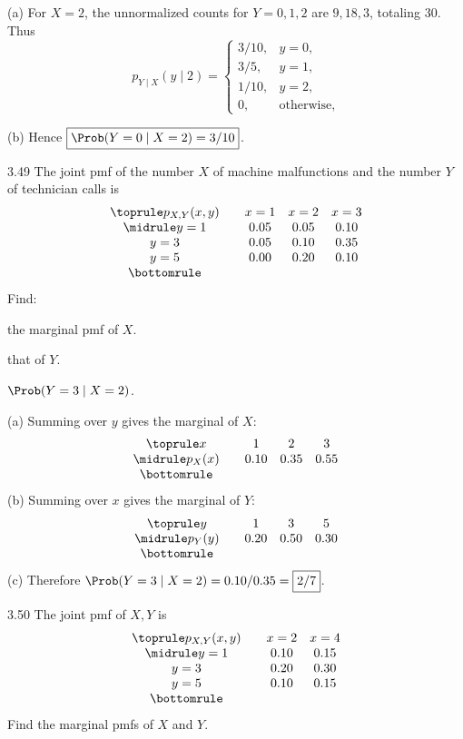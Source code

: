 \documentclass[11pt,oneside]{article}
\begin{document}
\begin{solution}
\noindent\textup{(a)} For $X=2$, the unnormalized counts for $Y=0,1,2$ are $9,18,3$, totaling $30$. Thus
\[
\boxed{p_{Y\mid X}(y\mid2)=\begin{cases}3/10,&y=0,\\3/5,&y=1,\\1/10,&y=2,\\0,&\text{otherwise},\end{cases}}
\]
\par\medskip
\noindent\textup{(b)} Hence $\boxed{\Prob(Y=0\mid X=2)=3/10}$.
\end{solution}

\begin{exercise}{3.49}
The joint pmf of the number $X$ of machine malfunctions and the number $Y$ of technician calls is
\[
\begin{array}{c@{\qquad}ccc}\toprule
p_{X,Y}(x,y)&x=1&x=2&x=3\\\midrule
y=1&0.05&0.05&0.10\\
y=3&0.05&0.10&0.35\\
y=5&0.00&0.20&0.10\\\bottomrule
\end{array}
\]
Find:
\begin{exercisesubparts}
\item the marginal pmf of $X$.
\item that of $Y$.
\item $\Prob(Y=3\mid X=2)$.
\end{exercisesubparts}
\end{exercise}

\begin{solution}
\noindent\textup{(a)} Summing over $y$ gives the marginal of $X$:
\[
\begin{array}{c@{\qquad}ccc}\toprule
x&1&2&3\\\midrule p_X(x)&0.10&0.35&0.55\\\bottomrule
\end{array}
\]
\noindent\textup{(b)} Summing over $x$ gives the marginal of $Y$:
\[
\begin{array}{c@{\qquad}ccc}\toprule
y&1&3&5\\\midrule p_Y(y)&0.20&0.50&0.30\\\bottomrule
\end{array}
\]
\noindent\textup{(c)} Therefore $\Prob(Y=3\mid X=2)=0.10/0.35=\boxed{2/7}$.
\end{solution}

\begin{exercise}{3.50}
The joint pmf of $X,Y$ is
\[
\begin{array}{c@{\qquad}cc}\toprule
p_{X,Y}(x,y)&x=2&x=4\\\midrule
y=1&0.10&0.15\\
y=3&0.20&0.30\\
y=5&0.10&0.15\\\bottomrule
\end{array}
\]
Find the marginal pmfs of $X$ and $Y$.
\end{exercise}
\end{document}
